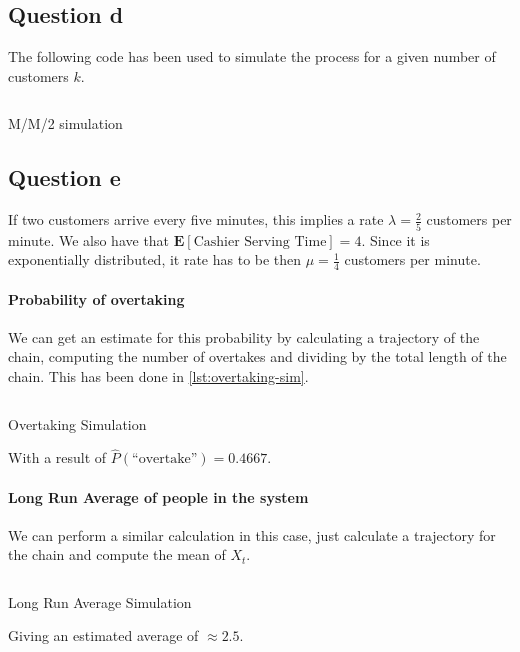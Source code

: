 \documentclass[11pt, a4paper]{article}
\begin{document}
\subsection*{Question d}
The following code has been used to simulate the process for a given number of customers $k$.

\begin{listing}[H]
	\inputminted[firstline = 143, lastline = 166]{R}{../main.R}
	\caption{M/M/2 simulation}
	\label{lst:mm2sim}
\end{listing}

\subsection*{Question e}
If two customers arrive every five minutes, this implies a rate $\lambda = \frac{2}{5}$ customers per minute. We also have that $\mathbf{E}\left[ \text{Cashier Serving Time}\right] = 4$. Since it is exponentially distributed, it rate has to be then $\mu = \frac{1}{4}$ customers per minute.

\paragraph{Probability of overtaking}
We can get an estimate for this probability by calculating a trajectory of the chain, computing the number of overtakes and dividing by the total length of the chain. This has been done in \cref{lst:overtaking-sim}.
\begin{listing}[H]
	\inputminted[firstline = 175, lastline = 182]{R}{../main.R}
	\caption{Overtaking Simulation}
	\label{lst:overtaking-sim}
\end{listing}
With a result of $\hat P(\text{``overtake''}) = 0.4667$.

\paragraph{Long Run Average of people in the system}
We can perform a similar calculation in this case, just calculate a trajectory for the chain and compute the mean of $X_t$.
\begin{listing}[H]
	\inputminted[firstline = 184, lastline = 185]{R}{../main.R}
	\caption{Long Run Average Simulation}
	\label{lst:longrun-sim}
\end{listing}
Giving an estimated average of $\approx2.5$.
\end{document}
